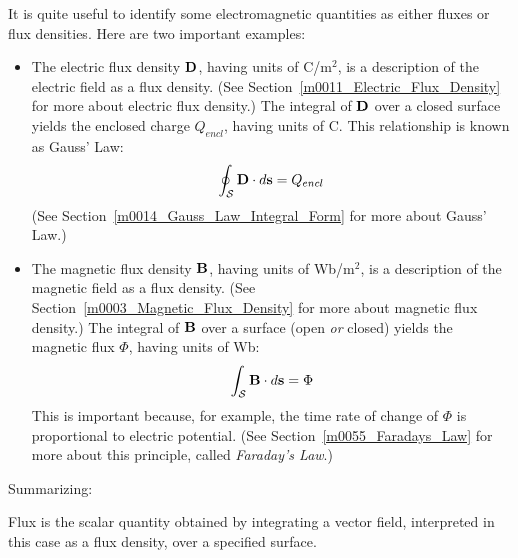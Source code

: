 It is quite useful to identify some electromagnetic quantities as either fluxes or flux densities.  
Here are two important examples:
%
\begin{itemize}
\item The electric flux density ${\bf D}$, 
having units of C/m$^2$, is a description of the electric field as a flux density.
(See Section~\ref{m0011_Electric_Flux_Density} for more about electric flux density.) 
The integral of ${\bf D}$ over a closed surface yields the enclosed charge $Q_{encl}$, having units of C.
This relationship is known as Gauss' Law:
%
\begin{equation}
\oint_{\mathcal S} {\bf D}\cdot d{\bf s} = Q_{encl} 
\label{m0044_GaussLawIntegralForm}
\end{equation}
%
(See Section~\ref{m0014_Gauss_Law_Integral_Form} for more about Gauss' Law.)
\item The magnetic flux density 
${\bf B}$, having units of Wb/m$^2$, is a description of the magnetic field as a flux density.
(See Section~\ref{m0003_Magnetic_Flux_Density} for more about magnetic flux density.)
The integral of ${\bf B}$ over a surface (open \emph{or} closed) yields the magnetic flux $\Phi$, having units of Wb:
%
\begin{equation}
\int_{\mathcal S} {\bf B}\cdot d{\bf s} = \Phi 
\end{equation}
%
This is important because, for example, the time rate of change of $\Phi$ is proportional to electric potential.
(See Section~\ref{m0055_Faradays_Law} for more about this principle, called \emph{Faraday's Law}.)
\end{itemize} 

Summarizing:
%
\begin{mdframed}[backgroundcolor=yellow!20,nobreak=true] 
Flux 
is the scalar quantity obtained by integrating a vector field, interpreted in this case as a flux density, over a specified surface.
\end{mdframed}

